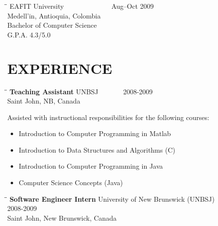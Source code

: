 \documentclass{res}
\begin{document}
\begin{resume}
   \begin{tabbing}
   \hspace{2.3in}\= \hspace{2.6in}\= \kill %
        EAFIT University\> ~~~~~~ \> ~~~~~~ Aug--Oct 2009\\
        Medell\a'in, Antioquia, Colombia\\
        Bachelor of Computer Science\\
        G.P.A. 4.3/5.0\\
   \end{tabbing}\vspace{-20pt}      %

\section{EXPERIENCE}
   \vspace{0.05 in}	
   
   \begin{tabbing}
   \hspace{2.3in}\= \hspace{2.6in}\= \kill %
    {\bf Teaching Assistant} \>UNBSJ\> ~~~~~~ 2008-2009\\
                             \>Saint John, NB, Canada
   \end{tabbing}\vspace{-5pt}      %
   Assisted with instructional responsibilities for the following courses:
   \begin{itemize}
       \item Introduction to Computer Programming in Matlab
       \item Introduction to Data Structures and Algorithms (C)
       \item Introduction to Computer Programming in Java
       \item Computer Science Concepts (Java)
   \end{itemize}
   
   \begin{tabbing}
   \hspace{2.3in}\= \hspace{2.6in}\= \kill %
    {\bf Software Engineer Intern} \>University of New Brunswick (UNBSJ)\> ~~~~~~ 2008-2009\\
                             \>Saint John, New Brunswick, Canada
   \end{tabbing}\vspace{-5pt}      %


\end{resume}
\end{document}
